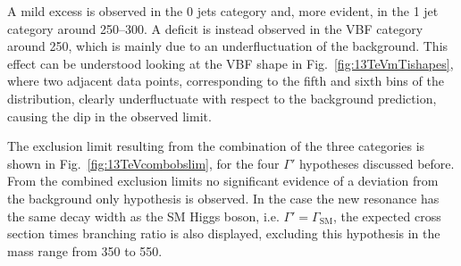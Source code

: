 A mild excess is observed in the 0 jets category and, more evident, in the 1 jet category around 250--300\GeV. A deficit is instead observed in the VBF category around 250\GeV, which is mainly due to an underfluctuation of the background. This effect can be understood looking at the VBF shape in Fig.~\ref{fig:13TeVmTishapes}, where two adjacent data points, corresponding to the fifth and sixth bins of the \mti distribution, clearly underfluctuate with respect to the background prediction, causing the dip in the observed limit.

The exclusion limit resulting from the combination of the three categories is shown in Fig.~\ref{fig:13TeVcombobslim}, for the four $\Gamma'$ hypotheses discussed before. From the combined exclusion limits no significant evidence of a deviation from the background only hypothesis is observed. In the case the new resonance has the same decay width as the SM Higgs boson, i.e. $\Gamma'=\Gamma_\mathrm{SM}$, the expected cross section times branching ratio is also displayed, excluding this hypothesis in the mass range from 350 to 550\GeV.

